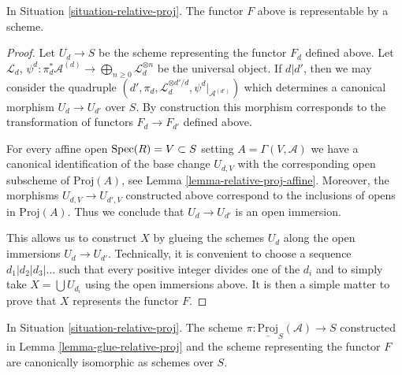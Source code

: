 \begin{lemma}
\label{lemma-relative-proj}
In Situation \ref{situation-relative-proj}.
The functor $F$ above is representable by a scheme.
\end{lemma}

\begin{proof}
Let $U_d \to S$ be the scheme representing the functor $F_d$
defined above. Let $\mathcal{L}_d$,
$\psi^d : \pi_d^*\mathcal{A}^{(d)} \to
\bigoplus_{n \geq 0} \mathcal{L}_d^{\otimes n}$ be the universal object.
If $d | d'$, then we may consider the quadruple
$(d', \pi_d, \mathcal{L}_d^{\otimes d'/d}, \psi^d|_{\mathcal{A}^{(d')}})$
which determines a canonical morphism $U_d \to U_{d'}$ over $S$.
By construction this morphism corresponds to the transformation
of functors $F_d \to F_{d'}$ defined above.

\medskip\noindent
For every affine open $\mathop{\mathrm{Spec}}(R) = V \subset S$
setting $A = \Gamma(V, \mathcal{A})$ we have a canonical
identification of the base change $U_{d, V}$ with the corresponding open
subscheme of $\text{Proj}(A)$, see Lemma \ref{lemma-relative-proj-affine}.
Moreover, the morphisms $U_{d, V} \to U_{d', V}$ constructed above
correspond to the inclusions of opens in $\text{Proj}(A)$.
Thus we conclude that $U_d \to U_{d'}$ is an open immersion.

\medskip\noindent
This allows us to construct $X$
by glueing the schemes $U_d$ along the open immersions $U_d \to U_{d'}$.
Technically, it is convenient to choose a sequence
$d_1 | d_2 | d_3 | \ldots$ such that every positive integer
divides one of the $d_i$ and to simply take
$X = \bigcup U_{d_i}$ using the open immersions above.
It is then a simple matter to prove that $X$ represents the
functor $F$.
\end{proof}

\begin{lemma}
\label{lemma-glueing-gives-functor-proj}
In Situation \ref{situation-relative-proj}.
The scheme $\pi : \underline{\text{Proj}}_S(\mathcal{A}) \to S$
constructed in Lemma \ref{lemma-glue-relative-proj}
and the scheme representing the functor $F$
are canonically isomorphic as schemes over $S$.
\end{lemma}

